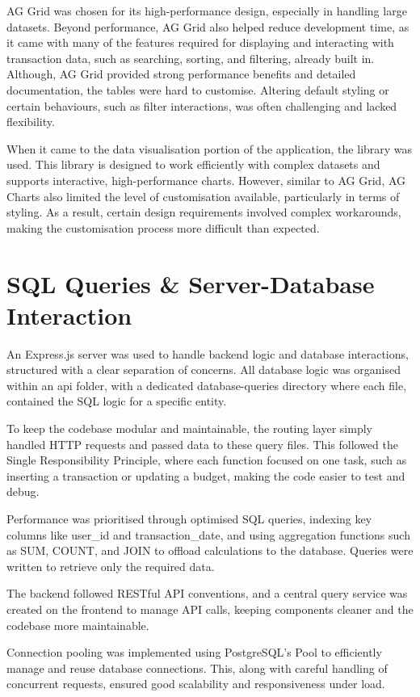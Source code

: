 \documentclass{l4proj}
\begin{document}
AG Grid was chosen for its high-performance design, especially in handling large datasets. Beyond performance, AG Grid also helped reduce development time, as it came with many of the features required for displaying and interacting with transaction data, such as searching, sorting, and filtering, already built in. Although, AG Grid provided strong performance benefits and detailed documentation, the tables were hard to customise. Altering default styling or certain behaviours, such as filter interactions, was often challenging and lacked flexibility.

When it came to the data visualisation portion of the application, the \citet{ag_charts} library was used. This library is designed to work efficiently with complex datasets and supports interactive, high-performance charts. However, similar to AG Grid, AG Charts also limited the level of customisation available, particularly in terms of styling. As a result, certain design requirements involved complex workarounds, making the customisation process more difficult than expected.


\section{SQL Queries \& Server-Database Interaction}
An Express.js server was used to handle backend logic and database interactions, structured with a clear separation of concerns. All database logic was organised within an api folder, with a dedicated database-queries directory where each file, contained the SQL logic for a specific entity.

To keep the codebase modular and maintainable, the routing layer simply handled HTTP requests and passed data to these query files. This followed the Single Responsibility Principle, where each function focused on one task, such as inserting a transaction or updating a budget, making the code easier to test and debug.

Performance was prioritised through optimised SQL queries, indexing key columns like user\_id and transaction\_date, and using aggregation functions such as SUM, COUNT, and JOIN to offload calculations to the database. Queries were written to retrieve only the required data.

The backend followed RESTful API conventions, and a central query service was created on the frontend to manage API calls, keeping components cleaner and the codebase more maintainable.

Connection pooling was implemented using PostgreSQL’s Pool to efficiently manage and reuse database connections. This, along with careful handling of concurrent requests, ensured good scalability and responsiveness under load.
\end{document}
